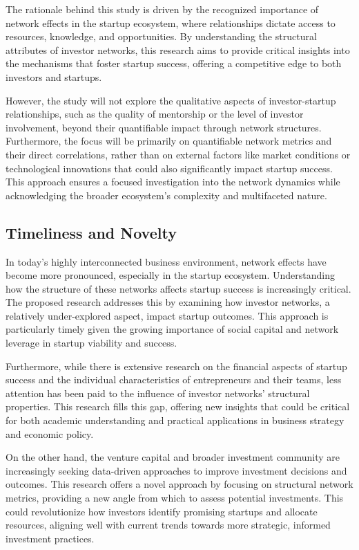\documentclass[a4paper,11pt]{article}
\begin{document}
The rationale behind this study is driven by the recognized importance of network effects in the startup ecosystem, where relationships dictate access to resources, knowledge, and opportunities. By understanding the structural attributes of investor networks, this research aims to provide critical insights into the mechanisms that foster startup success, offering a competitive edge to both investors and startups.

However, the study will not explore the qualitative aspects of investor-startup relationships, such as the quality of mentorship or the level of investor involvement, beyond their quantifiable impact through network structures. Furthermore, the focus will be primarily on quantifiable network metrics and their direct correlations, rather than on external factors like market conditions or technological innovations that could also significantly impact startup success. This approach ensures a focused investigation into the network dynamics while acknowledging the broader ecosystem's complexity and multifaceted nature.

\subsection{Timeliness and Novelty}
In today’s highly interconnected business environment, network effects have become more pronounced, especially in the startup ecosystem. Understanding how the structure of these networks affects startup success is increasingly critical. The proposed research addresses this by examining how investor networks, a relatively under-explored aspect, impact startup outcomes. This approach is particularly timely given the growing importance of social capital and network leverage in startup viability and success.

Furthermore, while there is extensive research on the financial aspects of startup success and the individual characteristics of entrepreneurs and their teams, less attention has been paid to the influence of investor networks' structural properties. This research fills this gap, offering new insights that could be critical for both academic understanding and practical applications in business strategy and economic policy.

On the other hand, the venture capital and broader investment community are increasingly seeking data-driven approaches to improve investment decisions and outcomes. This research offers a novel approach by focusing on structural network metrics, providing a new angle from which to assess potential investments. This could revolutionize how investors identify promising startups and allocate resources, aligning well with current trends towards more strategic, informed investment practices.
\end{document}
